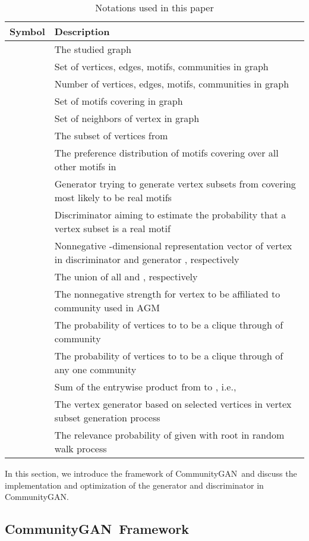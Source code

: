 \documentclass[sigconf]{acmart}
\newcommand{\ComGAN}{CommunityGAN}
\begin{document}
\begin{table}[tbp]
  \footnotesize
  \caption{Notations used in this paper}
  \label{tab:notation}
  \begin{tabular}{c|p{4.9cm}}
    \toprule
    Symbol&Description\\
    \midrule
         & The studied graph \\
         & Set of vertices, edges, motifs, communities in graph  \\
          & Number of vertices, edges, motifs, communities in graph  \\
              & Set of motifs covering  in graph   \\
              & Set of neighbors of vertex  in graph   \\
                   & The subset of vertices from  \\
     & The preference distribution of motifs covering  over all other motifs in  \\
   & Generator trying to generate vertex subsets from  covering  most likely to be real motifs \\
      & Discriminator aiming to estimate the probability that a vertex subset  is a real motif  \\
   & Nonnegative -dimensional representation vector of vertex  in discriminator  and generator , respectively \\
   & The union of all  and , respectively \\
              & The nonnegative strength for vertex  to be affiliated to community  used in AGM \\
   & The probability of  vertices  to  to be a clique through of community  \\
   & The probability of  vertices  to  to be a clique through of any one community \\
   & Sum of the entrywise product from  to , i.e.,  \\
   & The vertex generator based on selected vertices  in vertex subset generation process\\
   & The relevance probability of  given  with root  in random walk process \\
  \bottomrule
\end{tabular}
\end{table}

In this section, we introduce the framework of \ComGAN~and discuss the implementation and optimization of the generator and discriminator in \ComGAN.

\subsection{\ComGAN~Framework}
\end{document}
